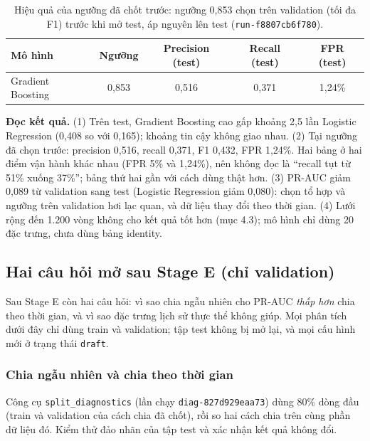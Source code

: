 \documentclass[11pt,a4paper]{article}
\newcommand{\code}[1]{\texttt{\small #1}}
\begin{document}
\begin{table}[H]\centering
\caption{Hiệu quả của ngưỡng đã chốt trước: ngưỡng 0,853 chọn trên validation (tối đa F1) trước khi mở test, áp nguyên lên test (\code{run-f8807cb6f780}).}
\begin{tabular}{@{}lcccc@{}}
\toprule
Mô hình & Ngưỡng & Precision (test) & Recall (test) & FPR (test) \\ \midrule
Gradient Boosting & 0,853 & 0,516 & 0,371 & 1,24\% \\ \bottomrule
\end{tabular}
\end{table}

\begin{keypoint}
\textbf{Đọc kết quả.} (1) Trên test, Gradient Boosting cao gấp khoảng 2,5 lần Logistic Regression (0,408 so với 0,165); khoảng tin cậy không giao nhau. (2) Tại ngưỡng đã chọn trước: precision 0,516, recall 0,371, F1 0,432, FPR 1,24\%. Hai bảng ở hai điểm vận hành khác nhau (FPR 5\% và 1,24\%), nên không đọc là ``recall tụt từ 51\% xuống 37\%''; bảng thứ hai gần với cách dùng thật hơn. (3) PR-AUC giảm 0,089 từ validation sang test (Logistic Regression giảm 0,080): chọn tổ hợp và ngưỡng trên validation hơi lạc quan, và dữ liệu thay đổi theo thời gian. (4) Lưới rộng đến 1.200 vòng không cho kết quả tốt hơn (mục 4.3); mô hình chỉ dùng 20 đặc trưng, chưa dùng bảng identity.
\end{keypoint}

\subsection{Hai câu hỏi mở sau Stage E (chỉ validation)}
Sau Stage E còn hai câu hỏi: vì sao chia ngẫu nhiên cho PR-AUC \emph{thấp hơn} chia theo thời gian, và vì sao đặc trưng lịch sử thực thể không giúp. Mọi phân tích dưới đây chỉ dùng train và validation; tập test không bị mở lại, và mọi cấu hình mới ở trạng thái \code{draft}.

\subsubsection{Chia ngẫu nhiên và chia theo thời gian}
Công cụ \code{split\_diagnostics} (lần chạy \code{diag-827d929eaa73}) dùng 80\% dòng đầu (train và validation của cách chia đã chốt), rồi so hai cách chia trên cùng phần dữ liệu đó. Kiểm thử đảo nhãn của tập test và xác nhận kết quả không đổi.
\end{document}
